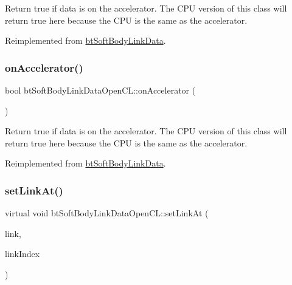 Return true if data is on the accelerator. The C\+PU version of this class will return true here because the C\+PU is the same as the accelerator. 

Reimplemented from \hyperlink{classbtSoftBodyLinkData_ae284c2a182ddf82dde057a8c2eb17ac3}{bt\+Soft\+Body\+Link\+Data}.

\mbox{\label{classbtSoftBodyLinkDataOpenCL_a3e97987329d5a5e7a4a51523fa9d4651}} 
\subsubsection{\texorpdfstring{on\+Accelerator()}{onAccelerator()}\hspace{0.1cm}{\footnotesize\ttfamily [2/2]}}
{\footnotesize\ttfamily bool bt\+Soft\+Body\+Link\+Data\+Open\+C\+L\+::on\+Accelerator (\begin{DoxyParamCaption}{ }\end{DoxyParamCaption})\hspace{0.3cm}{\ttfamily [virtual]}}

Return true if data is on the accelerator. The C\+PU version of this class will return true here because the C\+PU is the same as the accelerator. 

Reimplemented from \hyperlink{classbtSoftBodyLinkData_ae284c2a182ddf82dde057a8c2eb17ac3}{bt\+Soft\+Body\+Link\+Data}.

\mbox{\label{classbtSoftBodyLinkDataOpenCL_a4602606fdbcaa6cd2a976c71f7582398}} 
\subsubsection{\texorpdfstring{set\+Link\+At()}{setLinkAt()}\hspace{0.1cm}{\footnotesize\ttfamily [1/2]}}
{\footnotesize\ttfamily virtual void bt\+Soft\+Body\+Link\+Data\+Open\+C\+L\+::set\+Link\+At (\begin{DoxyParamCaption}\item[{const \hyperlink{classbtSoftBodyLinkData_1_1LinkDescription}{Link\+Description} \&}]{link,  }\item[{int}]{link\+Index }\end{DoxyParamCaption})\hspace{0.3cm}{\ttfamily [virtual]}}

